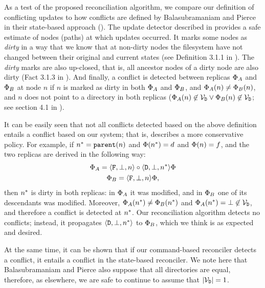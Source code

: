 As a test of the proposed reconciliation algorithm, 
we compare our definition of conflicting
updates to how conflicts are defined by Balasubramaniam and Pierce
in their state-based approach (\cite{BP}).
The update detector described in \cite{BP} provides a safe estimate of nodes
(paths) at which updates occurred.
It marks some nodes as \emph{dirty} in a way that we know that at non-dirty nodes
the filesystem have not changed between their original and current states
(see Definition 3.1.1 in \cite{BP}).
The \emph{dirty} marks are also up-closed, that is, all ancestor nodes of a dirty node
are also dirty (Fact 3.1.3 in \cite{BP}).
And finally, a conflict is detected between replicas $\Phi_A$ and $\Phi_B$ at node $n$
if $n$ is marked as dirty in both $\Phi_A$ and $\Phi_B$, and
$\Phi_A(n)\neq\Phi_B(n)$, and $n$ does not point to a directory in both replicas
($\Phi_A(n)\not\in\mathcal{V}_{\mathtt{D}} \vee \Phi_B(n)\not\in\mathcal{V}_{\mathtt{D}}$; see section 4.1 in \cite{BP}).

It can be easily seen that not all conflicts detected based on the above definition
entails a conflict based on our system; that is, \cite{BP} describes a more
conservative policy.
For example, if $n^*=\mathtt{parent}(n)$ and $\Phi(n^*)=d$ and $\Phi(n)=f$, and
the two replicas are derived in the following way:
\begin{gather*}
\Phi_A = \langle{\mathtt{F},\bot,n}\rangle \circ \langle{\mathtt{D},\bot,n^*}\rangle \Phi \\
\Phi_B = \langle{\mathtt{F},\bot,n}\rangle \Phi,
\end{gather*}
then $n^*$ is dirty in both replicas:
in $\Phi_A$ it was modified, and in $\Phi_B$ one of its descendants was modified.
Moreover, $\Phi_A(n^*)\neq\Phi_B(n^*)$ and $\Phi_A(n^*)=\bot\not\in\mathcal{V}_{\mathtt{D}}$,
and therefore a conflict is detected at $n^*$.
Our reconciliation algorithm detects no conflicts;
instead, it propagates $\langle{\mathtt{D},\bot,n^*}\rangle$ to $\Phi_B$, which we think is as expected
and desired.

At the same time, it can be shown that if our command-based reconciler
detects a conflict, it entails a conflict in the state-based reconciler.
We note here that Balasubramaniam and Pierce also suppose that all directories are equal,
therefore, as elsewhere, we are safe to continue to assume that $|\mathcal{V}_{\mathtt{D}}|=1$.

